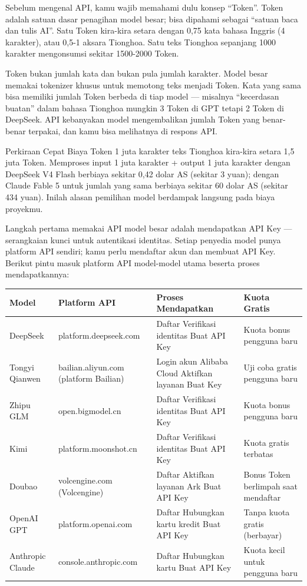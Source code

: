 
Sebelum mengenal API, kamu wajib memahami dulu konsep “Token”. Token adalah satuan dasar penagihan model besar; bisa dipahami sebagai “satuan baca dan tulis AI”. Satu Token kira-kira setara dengan 0,75 kata bahasa Inggris (4 karakter), atau 0,5-1 aksara Tionghoa. Satu teks Tionghoa sepanjang 1000 karakter mengonsumsi sekitar 1500-2000 Token.

Token bukan jumlah kata dan bukan pula jumlah karakter. Model besar memakai tokenizer khusus untuk memotong teks menjadi Token. Kata yang sama bisa memiliki jumlah Token berbeda di tiap model — misalnya “kecerdasan buatan” dalam bahasa Tionghoa mungkin 3 Token di GPT tetapi 2 Token di DeepSeek. API kebanyakan model mengembalikan jumlah Token yang benar-benar terpakai, dan kamu bisa melihatnya di respons API.

\begin{tcbinfo}{Perkiraan Cepat Biaya Token}
1 juta karakter teks Tionghoa kira-kira setara 1,5 juta Token. Memproses input 1 juta karakter + output 1 juta karakter dengan DeepSeek V4 Flash berbiaya sekitar 0,42 dolar AS (sekitar 3 yuan); dengan Claude Fable 5 untuk jumlah yang sama berbiaya sekitar 60 dolar AS (sekitar 434 yuan). Inilah alasan pemilihan model berdampak langsung pada biaya proyekmu.

\end{tcbinfo}


Langkah pertama memakai API model besar adalah mendapatkan API Key — serangkaian kunci untuk autentikasi identitas. Setiap penyedia model punya platform API sendiri; kamu perlu mendaftar akun dan membuat API Key. Berikut pintu masuk platform API model-model utama beserta proses mendapatkannya:

\begin{center}
\begin{tabularx}{\linewidth}{|X|X|X|X|}
\hline
\textbf{Model} & \textbf{Platform API} & \textbf{Proses Mendapatkan} & \textbf{Kuota Gratis} \tabularnewline
\hline
DeepSeek & platform.deepseek.com & Daftar Verifikasi identitas Buat API Key & Kuota bonus pengguna baru \tabularnewline
Tongyi Qianwen & bailian.aliyun.com (platform Bailian) & Login akun Alibaba Cloud Aktifkan layanan Buat Key & Uji coba gratis pengguna baru \tabularnewline
Zhipu GLM & open.bigmodel.cn & Daftar Verifikasi identitas Buat API Key & Kuota bonus pengguna baru \tabularnewline
Kimi & platform.moonshot.cn & Daftar Verifikasi identitas Buat API Key & Kuota gratis terbatas \tabularnewline
Doubao & volcengine.com (Volcengine) & Daftar Aktifkan layanan Ark Buat API Key & Bonus Token berlimpah saat mendaftar \tabularnewline
OpenAI GPT & platform.openai.com & Daftar Hubungkan kartu kredit Buat API Key & Tanpa kuota gratis (berbayar) \tabularnewline
Anthropic Claude & console.anthropic.com & Daftar Hubungkan kartu Buat API Key & Kuota kecil untuk pengguna baru \tabularnewline
\hline
\end{tabularx}
\end{center}

